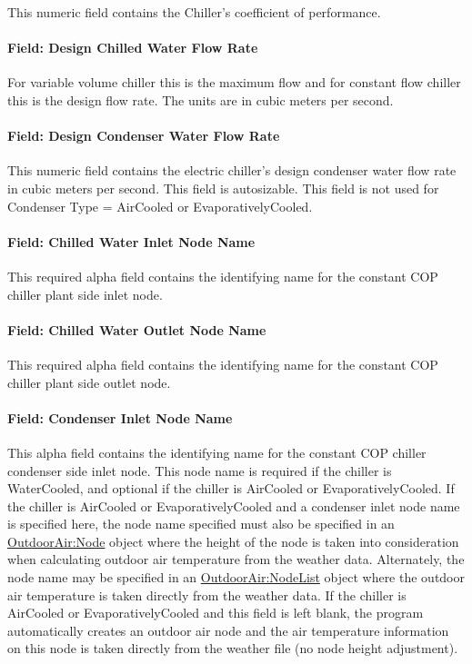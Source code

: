 This numeric field contains the Chiller's coefficient of performance.

\paragraph{Field: Design Chilled Water Flow Rate}\label{field-design-chilled-water-flow-rate-2}

For variable volume chiller this is the maximum flow and for constant flow chiller this is the design flow rate. The units are in cubic meters per second.

\paragraph{Field: Design Condenser Water Flow Rate}\label{field-design-condenser-water-flow-rate-2}

This numeric field contains the electric chiller's design condenser water flow rate in cubic meters per second. This field is autosizable. This field is not used for Condenser Type = AirCooled or EvaporativelyCooled.

\paragraph{Field: Chilled Water Inlet Node Name}\label{field-chilled-water-inlet-node-name-2}

This required alpha field contains the identifying name for the constant COP chiller plant side inlet node.

\paragraph{Field: Chilled Water Outlet Node Name}\label{field-chilled-water-outlet-node-name-2}

This required alpha field contains the identifying name for the constant COP chiller plant side outlet node.

\paragraph{Field: Condenser Inlet Node Name}\label{field-condenser-inlet-node-name-2}

This alpha field contains the identifying name for the constant COP chiller condenser side inlet node. This node name is required if the chiller is WaterCooled, and optional if the chiller is AirCooled or EvaporativelyCooled. If the chiller is AirCooled or EvaporativelyCooled and a condenser inlet node name is specified here, the node name specified must also be specified in an \hyperref[outdoorairnode]{OutdoorAir:Node} object where the height of the node is taken into consideration when calculating outdoor air temperature from the weather data. Alternately, the node name may be specified in an \hyperref[outdoorairnodelist]{OutdoorAir:NodeList} object where the outdoor air temperature is taken directly from the weather data. If the chiller is AirCooled or EvaporativelyCooled and this field is left blank, the program automatically creates an outdoor air node and the air temperature information on this node is taken directly from the weather file (no node height adjustment).

